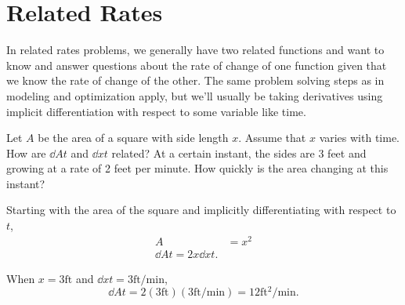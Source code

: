 \section{Related Rates}
In related rates problems, we generally have two related functions and want to know and answer questions about the rate of change of one function given that we know the rate of change of the other. The same problem solving steps as in modeling and optimization apply, but we'll usually be taking derivatives using implicit differentiation with respect to some variable like time.

\begin{example}
	Let $A$ be the area of a square with side length $x$.
	Assume that $x$ varies with time.
	How are $\dd{A}{t}$ and $\dd{x}{t}$ related?
	At a certain instant, the sides are 3 feet and growing at a rate of 2 feet per minute.
	How quickly is the area changing at this instant?
\end{example}
\begin{answer}
	Starting with the area of the square and implicitly differentiating with respect to $t$,
	\begin{align*}
		A &= x^2 \\
		\dd{A}{t} = 2x\dd{x}{t}.
	\end{align*}
	
	When $x=3\text{ft}$ and $\dd{x}{t}=3\text{ft/min}$,
	\begin{equation*}
		\dd{A}{t} = 2(3\text{ft})(3\text{ft/min}) = 12\text{ft$^2$/min}.
	\end{equation*}
\end{answer}


